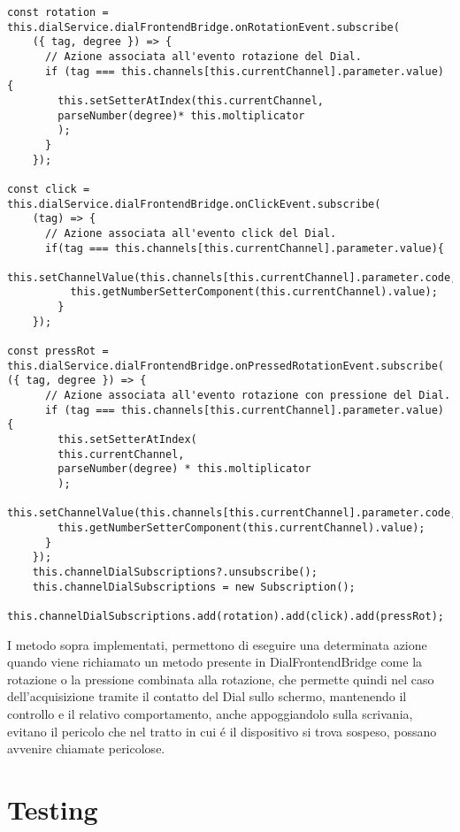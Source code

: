\vspace{1.0cm}
\begin{lstlisting}[caption={Ascolto eventi associati alla voce di menu' selezionata},style=javaScriptCode]
const rotation = this.dialService.dialFrontendBridge.onRotationEvent.subscribe(
	({ tag, degree }) => {
      // Azione associata all'evento rotazione del Dial.
      if (tag === this.channels[this.currentChannel].parameter.value) {
        this.setSetterAtIndex(this.currentChannel, 
        parseNumber(degree)* this.moltiplicator
        );
      }
    });

const click = this.dialService.dialFrontendBridge.onClickEvent.subscribe(
	(tag) => {
      // Azione associata all'evento click del Dial.
      if(tag === this.channels[this.currentChannel].parameter.value){
          this.setChannelValue(this.channels[this.currentChannel].parameter.code,
          this.getNumberSetterComponent(this.currentChannel).value);
        }
    });

const pressRot = this.dialService.dialFrontendBridge.onPressedRotationEvent.subscribe(
({ tag, degree }) => {
      // Azione associata all'evento rotazione con pressione del Dial.
      if (tag === this.channels[this.currentChannel].parameter.value) {
        this.setSetterAtIndex(
        this.currentChannel, 
        parseNumber(degree) * this.moltiplicator
        );
        this.setChannelValue(this.channels[this.currentChannel].parameter.code,
        this.getNumberSetterComponent(this.currentChannel).value);
      }
    });
    this.channelDialSubscriptions?.unsubscribe();
    this.channelDialSubscriptions = new Subscription();
    this.channelDialSubscriptions.add(rotation).add(click).add(pressRot);
\end{lstlisting} 
\vspace{1.0cm}


I metodo sopra implementati, permettono di eseguire una determinata azione quando viene richiamato un metodo presente in DialFrontendBridge come la rotazione o la pressione combinata alla rotazione, che permette quindi nel caso dell'acquisizione tramite il contatto del Dial sullo schermo, mantenendo il controllo e il relativo comportamento, anche appoggiandolo sulla scrivania, evitano il pericolo che nel tratto in cui é il dispositivo si trova sospeso, possano avvenire chiamate pericolose.

\section{Testing}

